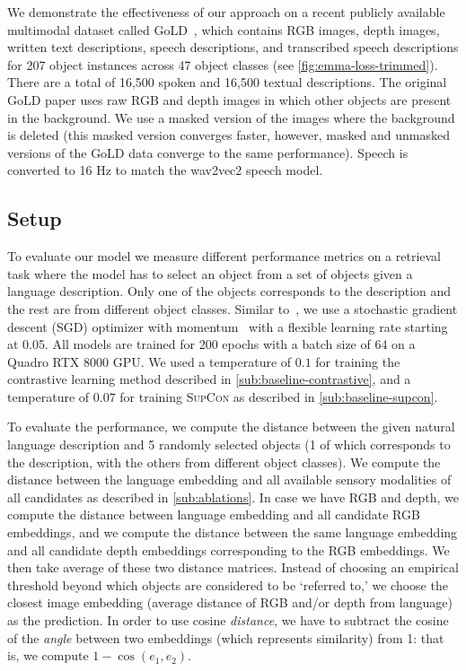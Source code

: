 \documentclass[10pt]{article} %
\newcommand{\supcon}{\textsc{SupCon}}
\begin{document}
We demonstrate the effectiveness of our approach on a recent publicly available multimodal dataset called GoLD~\citep{GoLD_UMBC}, which contains RGB images, depth images, written text descriptions, speech descriptions, and transcribed speech descriptions for 207 object instances across 47 object classes (see \cref{fig:emma-loss-trimmed}). There are a total of 16,500 spoken and 16,500 textual descriptions. The original GoLD paper uses raw RGB and depth images in which other objects are present in the background. We use a masked version of the images where the background is deleted (this masked version converges faster, however, masked and unmasked versions of the GoLD data converge to the same performance). Speech is converted to 16 Hz to match the wav2vec2 speech model.


\subsection{Setup}
\label{sec:setup}
To evaluate our model we measure different performance metrics on a retrieval task where the model has to select an object from a set of objects given a language description. Only one of the objects corresponds to the description and the rest are from different object classes.
% 
Similar to~\citet{NEURIPS2020_supervised_contrastive}, we use a stochastic gradient descent (SGD) optimizer with momentum~\citep{ruder2016overviewSGD} with a flexible learning rate starting at 0.05. 
All models are trained for 200 epochs with a batch size of 64 on a Quadro RTX 8000 GPU. We used a temperature of $0.1$ for training the contrastive learning method described in \cref{sub:baseline-contrastive}, and a temperature of $0.07$ for training \supcon{} as described in \cref{sub:baseline-supcon}.


To evaluate the performance, we compute the distance between the given natural language description and 5 randomly selected objects (1 of which corresponds to the description, with the others from different object classes). We compute the distance between the language embedding and all available sensory modalities of all candidates as described in \cref{sub:ablations}. In case we have RGB and depth, we compute the distance between language embedding and all candidate RGB embeddings, and we compute the distance between the same language embedding and all candidate depth embeddings corresponding to the RGB embeddings. We then take average of these two distance matrices. Instead of choosing an empirical threshold beyond which objects are considered to be `referred to,' we choose the closest image embedding (average distance of RGB and/or depth from language) as the prediction.
In order to use cosine \textit{distance}, we have to subtract the cosine of the \textit{angle} between two embeddings (which represents similarity) from 1: that is, we compute $1 - \cos(e_1, e_2)$.
\end{document}
